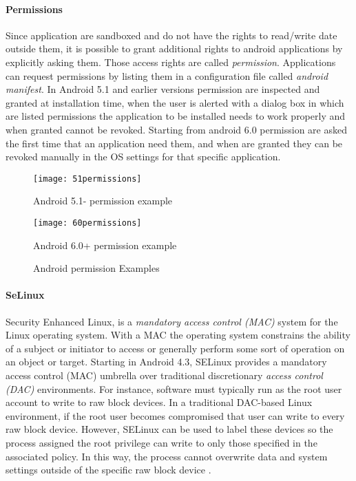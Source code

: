 	\paragraph{Permissions} Since application are sandboxed and do not have the rights to read/write date outside them, it is possible to grant additional rights to android applications by explicitly asking them. Those access rights are called \textit{permission}. Applications can request permissions by listing them in a configuration file called \textit{android manifest}. In Android 5.1 and earlier versions permission are inspected and granted at installation time, when the user is alerted with a dialog box in which are listed permissions the application to be installed needs to work properly and when granted cannot be revoked. Starting from android 6.0 permission are asked the first time that an application need them, and when are granted they can be revoked manually in the OS settings for that specific application.
	
		\begin{figure}[h]
		\centering
		\begin{minipage}[c]{.45\textwidth}
			\centering\setlength{\captionmargin}{0pt}%
			\texttt{[image: 51permissions]}
			\caption{Android 5.1- permission example}
		\end{minipage}%
		\hspace{10mm}%
		\begin{minipage}[c]{.45\textwidth}
			\centering\setlength{\captionmargin}{0pt}%
			\texttt{[image: 60permissions]}
			\caption{Android 6.0+ permission example}
		\end{minipage}
		\caption{Android permission Examples\label{fig:Andorid permission Examples}}
	\end{figure}

	\paragraph{SeLinux} Security Enhanced Linux, is a \textit{mandatory access control (MAC)} system for the Linux operating system. With a MAC the operating system constrains the ability of a subject or initiator to access or generally perform some sort of operation on an object or target. Starting in Android 4.3, SELinux provides a mandatory access control (MAC) umbrella over traditional discretionary \textit{access control (DAC)} environments. For instance, software must typically run as the root user account to write to raw block devices. In a traditional DAC-based Linux environment, if the root user becomes compromised that user can write to every raw block device. However, SELinux can be used to label these devices so the process assigned the root privilege can write to only those specified in the associated policy.
 	In this way, the process cannot overwrite data and system settings outside of the specific raw block device \cite{secure2017android}.

